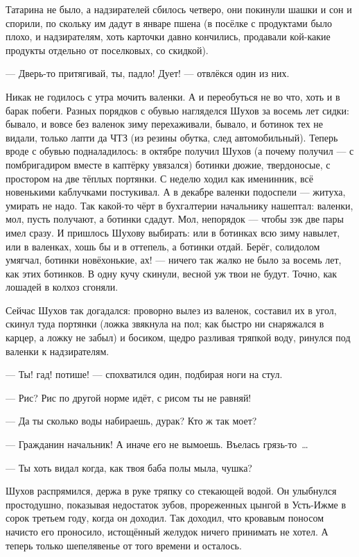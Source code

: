 Татарина не было, а надзирателей сбилось четверо, они покинули шашки и сон и спорили, по 
скольку им дадут в январе пшена (в посёлке с продуктами было плохо, и надзирателям, хоть 
карточки давно кончились, продавали кой-какие продукты отдельно от поселковых, со скидкой).

--- Дверь-то притягивай, ты, падло! Дует! --- отвлёкся один из них.

Никак не годилось с утра мочить валенки. А и переобуться не во что, хоть и в барак побеги. 
Разных порядков с обувью нагляделся Шухов за восемь лет сидки: бывало, и вовсе без валенок 
зиму перехаживали, бывало, и ботинок тех не видали, только лапти да ЧТЗ (из резины обутка, 
след автомобильный). Теперь вроде с обувью подналадилось: в октябре получил Шухов (а почему 
получил --- с помбригадиром вместе в каптёрку увязался) ботинки дюжие, твердоносые, с 
простором на две тёплых портянки. С неделю ходил как именинник, всё новенькими каблучками 
постукивал. А в декабре валенки подоспели --- житуха, умирать не надо. Так какой-то чёрт в 
бухгалтерии начальнику нашептал: валенки, мол, пусть получают, а ботинки сдадут. Мол, 
непорядок --- чтобы зэк две пары имел сразу. И пришлось Шухову выбирать: или в ботинках всю 
зиму навылет, или в валенках, хошь бы и в оттепель, а ботинки отдай. Берёг, солидолом умягчал, 
ботинки новёхонькие, ах! --- ничего так жалко не было за восемь лет, как этих ботинков. В одну 
кучу скинули, весной уж твои не будут. Точно, как лошадей в колхоз сгоняли.

Сейчас Шухов так догадался: проворно вылез из валенок, составил их в угол, скинул туда 
портянки (ложка звякнула на пол; как быстро ни снаряжался в карцер, а ложку не забыл) и 
босиком, щедро разливая тряпкой воду, ринулся под валенки к надзирателям.

--- Ты! гад! потише! --- спохватился один, подбирая ноги на стул.

--- Рис? Рис по другой норме идёт, с рисом ты не равняй!

--- Да ты сколько воды набираешь, дурак? Кто ж так моет?

--- Гражданин начальник! А иначе его не вымоешь. Въелась грязь-то~\dots{}

--- Ты хоть видал когда, как твоя баба полы мыла, чушка?

Шухов распрямился, держа в руке тряпку со стекающей водой. Он улыбнулся простодушно, 
показывая недостаток зубов, прореженных цынгой в Усть-Ижме в сорок третьем году, когда он 
доходил. Так доходил, что кровавым поносом начисто его проносило, истощённый желудок ничего 
принимать не хотел. А теперь только шепелявенье от того времени и осталось.

